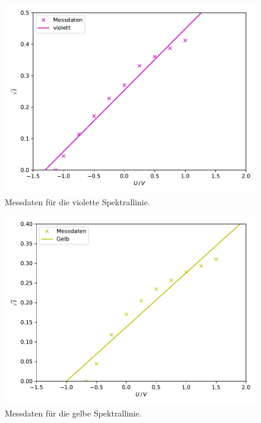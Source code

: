 \begin{figure}
  \centering
  \includegraphics[scale=0.4]{content/plot2.pdf}
  \caption{Messdaten für die violette Spektrallinie.}
  \label{fig:plot2}
\end{figure}

\begin{figure}
  \centering
  \includegraphics[scale=0.4]{content/plot3.pdf}
  \caption{Messdaten für die gelbe Spektrallinie.}
  \label{fig:plot3}
\end{figure}

